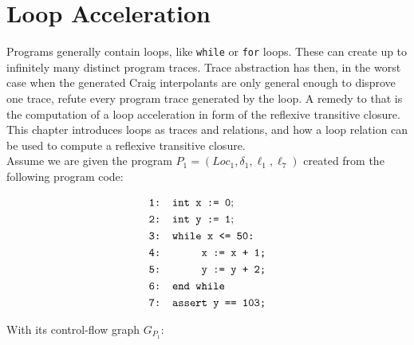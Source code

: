 \documentclass{article}
\begin{document}
\section{Loop Acceleration}
Programs generally contain loops, like \texttt{while} or \texttt{for} loops. These can create up to infinitely many distinct program traces. Trace abstraction has then, in the worst case when the generated Craig interpolants are only general enough to disprove one trace, refute every program trace generated by the loop. A remedy to that is the computation of a loop acceleration in form of the reflexive transitive closure. This chapter introduces loops as traces and relations, and how a loop relation can be used to compute a reflexive transitive closure. \\

Assume we are given the program $P_1 = (Loc_1, \delta_1, \ell_{1}, \ell_{7})$ created from the following program code: \\
\begin{figure}[H]
	\begin{align*}
		&\texttt{1: int x := 0}; \\
		&\texttt{2: int y := 1}; \\
		&\texttt{3: while x <= 50:} \\
		&\texttt{4: \hspace*{2em} x := x + 1;} \\
		&\texttt{5: \hspace*{2em} y := y + 2;} \\
		&\texttt{6: end while} \\
		&\texttt{7: assert y == 103;}
	\end{align*}
	\label{fig:square}
\end{figure}
With its control-flow graph $G_{P_1}$: \\
\end{document}
